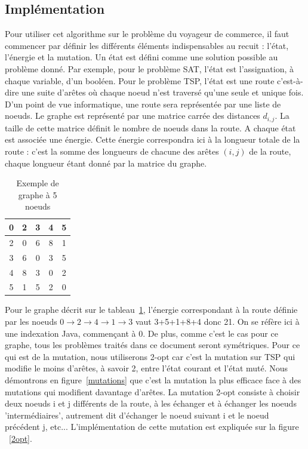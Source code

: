 \documentclass{article}%
\begin{document}
\subsection{Implémentation}

\vspace{1cm}

	Pour utiliser cet algorithme sur le problème du voyageur de commerce, il faut commencer par définir les différents éléments indispensables au recuit : l'état, l'énergie et la mutation.
	Un état est défini comme une solution possible au problème donné. Par exemple, pour le problème SAT, l'état est l'assignation, à chaque variable, d'un booléen. Pour le problème TSP, l'état est une route c'est-à-dire une suite d'arêtes où chaque noeud n'est traversé qu'une seule et unique fois. D'un point de vue informatique, une route sera représentée par une liste de noeuds. Le graphe est représenté par une matrice carrée des distances $ d_{i,j} $. La taille de cette matrice définit le nombre de noeuds dans la route. A chaque état est associée une énergie. Cette énergie correspondra ici à la longueur totale de la route : c'est la somme des longueurs de chacune des arêtes $ (i,j) $ de la route, chaque longueur étant donné par la matrice du graphe.
	
	
	\begin{table}[hp]
		\centering
			\begin{tabular}{|*{5}{c|}}
					\hline
					0  & 2  & 3 & 4 & 5 \\
					\hline
					2  & 0 & 6 & 8 & 1 \\
					\hline
					3  & 6 & 0 & 3 & 5 \\
					\hline
					4  & 8 & 3 & 0 & 2 \\
					\hline
					5  & 1 & 5 & 2 & 0 \\
					\hline
			\end{tabular}
		\label{tableau_distances}
		\caption{Exemple de graphe à 5 noeuds}
	\end{table}

		Pour le graphe décrit sur le tableau~\ref{tableau_distances}, l'énergie correspondant à la route définie par les noeuds $ 0\rightarrow 2\rightarrow 4\rightarrow 1\rightarrow 3 $ vaut 3+5+1+8+4 donc 21. On se réfère ici à une indexation Java, commençant à 0. De plus, comme c'est le cas pour ce graphe, tous les problèmes traités dans ce document seront symétriques.
		Pour ce qui est de la mutation, nous utiliserons 2-opt car c'est la mutation sur TSP qui modifie le moins d'arêtes, à savoir 2, entre l'état courant et l'état muté. Nous démontrons en figure~\ref{mutations} que c'est la mutation la plus efficace face à des mutations qui modifient davantage d'arêtes.
		La mutation 2-opt consiste à choisir deux noeuds i et j différents de la route, à les échanger et à échanger les noeuds 'intermédiaires', autrement dit d'échanger le noeud suivant i et le noeud précédent j, etc... L'implémentation de cette mutation est expliquée sur la figure ~\ref{2opt}.
	
\end{document}
